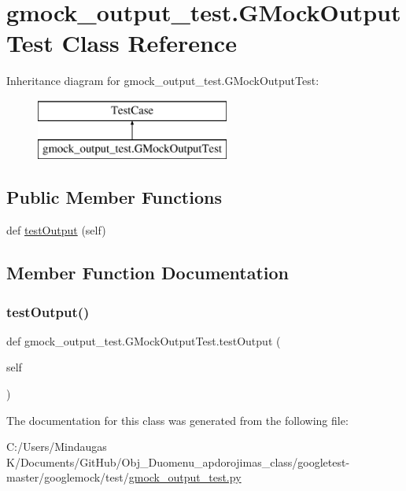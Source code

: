 \hypertarget{classgmock__output__test_1_1_g_mock_output_test}{}\section{gmock\+\_\+output\+\_\+test.\+G\+Mock\+Output\+Test Class Reference}
\label{classgmock__output__test_1_1_g_mock_output_test}
Inheritance diagram for gmock\+\_\+output\+\_\+test.\+G\+Mock\+Output\+Test\+:\begin{figure}[H]
\begin{center}
\leavevmode
\includegraphics[height=2.000000cm]{d6/d09/classgmock__output__test_1_1_g_mock_output_test}
\end{center}
\end{figure}
\subsection*{Public Member Functions}
\begin{DoxyCompactItemize}
\item 
def \mbox{\hyperlink{classgmock__output__test_1_1_g_mock_output_test_a661e7846690f48328fd9e0834fde9980}{test\+Output}} (self)
\end{DoxyCompactItemize}


\subsection{Member Function Documentation}
\mbox{\label{classgmock__output__test_1_1_g_mock_output_test_a661e7846690f48328fd9e0834fde9980}} 
\subsubsection{\texorpdfstring{testOutput()}{testOutput()}}
{\footnotesize\ttfamily def gmock\+\_\+output\+\_\+test.\+G\+Mock\+Output\+Test.\+test\+Output (\begin{DoxyParamCaption}\item[{}]{self }\end{DoxyParamCaption})}



The documentation for this class was generated from the following file\+:\begin{DoxyCompactItemize}
\item 
C\+:/\+Users/\+Mindaugas K/\+Documents/\+Git\+Hub/\+Obj\+\_\+\+Duomenu\+\_\+apdorojimas\+\_\+class/googletest-\/master/googlemock/test/\mbox{\hyperlink{googletest-master_2googlemock_2test_2gmock__output__test_8py}{gmock\+\_\+output\+\_\+test.\+py}}\end{DoxyCompactItemize}
